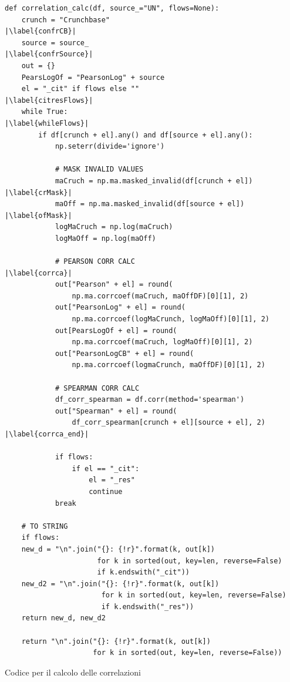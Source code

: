 \begin{listing}[htbp]
\begin{verbatim}
def correlation_calc(df, source_="UN", flows=None):
    crunch = "Crunchbase"                                       |\label{confrCB}|
    source = source_                                            |\label{confrSource}|
    out = {}
    PearsLogOf = "PearsonLog" + source
    el = "_cit" if flows else ""                                |\label{citresFlows}|
    while True:                                                 |\label{whileFlows}|
        if df[crunch + el].any() and df[source + el].any():
            np.seterr(divide='ignore')
            
            # MASK INVALID VALUES
            maCruch = np.ma.masked_invalid(df[crunch + el])   |\label{crMask}|
            maOff = np.ma.masked_invalid(df[source + el])     |\label{ofMask}|
            logMaCruch = np.log(maCruch)   
            logMaOff = np.log(maOff)    
            
            # PEARSON CORR CALC                                 |\label{corrca}|
            out["Pearson" + el] = round(
                np.ma.corrcoef(maCruch, maOffDF)[0][1], 2)
            out["PearsonLog" + el] = round(
                np.ma.corrcoef(logMaCrunch, logMaOff)[0][1], 2)
            out[PearsLogOf + el] = round(
                np.ma.corrcoef(maCruch, logMaOff)[0][1], 2)
            out["PearsonLogCB" + el] = round(
                np.ma.corrcoef(logmaCrunch, maOffDF)[0][1], 2)

            # SPEARMAN CORR CALC
            df_corr_spearman = df.corr(method='spearman')
            out["Spearman" + el] = round(
                df_corr_spearman[crunch + el][source + el], 2)  |\label{corrca_end}|

            if flows:
                if el == "_cit":
                    el = "_res"
                    continue
            break

    # TO STRING
    if flows:
    new_d = "\n".join("{}: {!r}".format(k, out[k])
                      for k in sorted(out, key=len, reverse=False) 
                      if k.endswith("_cit"))
    new_d2 = "\n".join("{}: {!r}".format(k, out[k])
                       for k in sorted(out, key=len, reverse=False) 
                       if k.endswith("_res"))
    return new_d, new_d2

    return "\n".join("{}: {!r}".format(k, out[k])
                     for k in sorted(out, key=len, reverse=False))
\end{verbatim}
\caption{Codice per il calcolo delle correlazioni}
\label{lst:corrCalc}
\end{listing}
